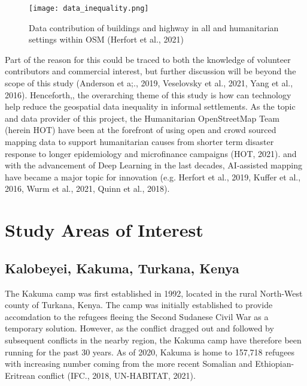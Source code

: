 \documentclass[11pt, a4paper, twoside]{report}
\begin{document}
\begin{figure}[H]
  \centering
  \texttt{[image: data\_inequality.png]}
  \caption{Data contribution of buildings and highway in all and humanitarian settings within OSM (Herfort et al., 2021)}
  \label{fig:data_inequality}
\end{figure}

Part of the reason for this could be traced to both the knowledge of volunteer contributors and commercial interest, but further discussion will be beyond the scope of this study (Anderson et a;., 2019, Veselovsky et al., 2021, Yang et al., 2016). Henceforth,, the overarching theme of this study is how can technology help reduce the geospatial data inequality in informal settlements. As the topic and data provider of this project, the Humanitarian OpenStreetMap Team (herein HOT) have been at the forefront of using open and crowd sourced mapping data to support humanitarian causes from shorter term disaster response to longer epidemiology and microfinance campaigns (HOT, 2021).  and with the advancement of Deep Learning in the last decades, AI-assisted mapping have became a major topic for innovation (e.g. Herfort et al., 2019, Kuffer et al., 2016, Wurm et al., 2021, Quinn et al., 2018).\\\par

\section{Study Areas of Interest}\label{StudyAOI}
\subsection{Kalobeyei, Kakuma, Turkana, Kenya}\label{Kalobeyei}

The Kakuma camp was first established in 1992, located in the rural North-West county of Turkana, Kenya. The camp was initially established to provide accomdation to the refugees fleeing the Second Sudanese Civil War as a temporary solution. However, as the conflict dragged out and followed by subsequent conflicts in the nearby region, the Kakuma camp have therefore been running for the past 30 years. As of 2020, Kakuma is home to 157,718 refugees with increasing number coming from the more recent Somalian and Ethiopian-Eritrean conflict (IFC., 2018, UN-HABITAT, 2021).\\\par
\end{document}
